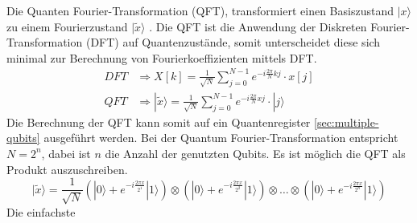 Die Quanten Fourier-Transformation (QFT), transformiert einen Basiszustand $|x\rangle$ zu einem Fourierzustand $|\tilde{x}\rangle$ \cite{Qiskit-Textbook}. Die QFT ist die Anwendung der Diskreten Fourier-Transformation (DFT) auf Quantenzust\"ande, somit unterscheidet diese sich minimal zur Berechnung von Fourierkoeffizienten mittels DFT.
\begin{equation}
  \begin{aligned}
    DFT &\Rightarrow X[k] = \frac{1}{\sqrt{N}}\sum\limits_{j=0}^{N-1}e^{-i\frac{2\pi}{N}kj}\cdot x[j] \\[1em]
    QFT &\Rightarrow |\tilde{x}\rangle = \frac{1}{\sqrt{N}}\sum\limits_{j=0}^{N-1}e^{-i\frac{2\pi}{N}xj}\cdot|j\rangle
  \end{aligned}
\end{equation}
Die Berechnung der QFT kann somit auf ein Quantenregister \ref{sec:multiple-qubits} ausgef\"uhrt werden. Bei der Quantum Fourier-Transformation entspricht $N = 2^n$, dabei ist $n$ die Anzahl der genutzten Qubits. Es ist m\"oglich die QFT als Produkt auszuschreiben.
\begin{equation}
  |\tilde{x}\rangle = \frac{1}{\sqrt{N}} \left(|0\rangle + e^{-i\frac{2\pi x}{2^1}}|1\rangle\right)\otimes\left(|0\rangle + e^{-i\frac{2\pi x}{2^2}}|1\rangle\right)\otimes\dots\otimes\left(|0\rangle + e^{-i\frac{2\pi x}{2^n}}|1\rangle\right)
\end{equation}
Die einfachste
